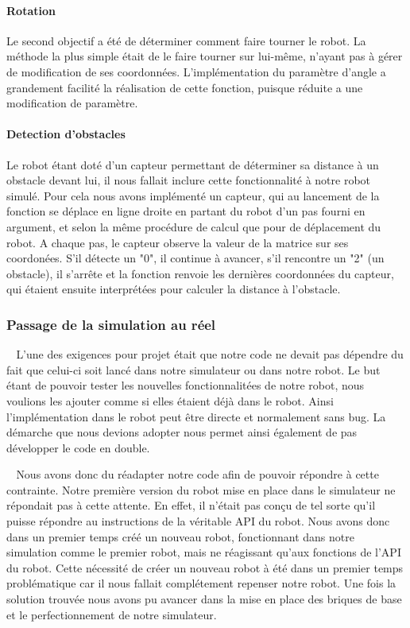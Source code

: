 \documentclass[12pt]{article}
\def\tab{$\>\>\>\>$}
\begin{document}
\paragraph{Rotation\\}
Le second objectif a été de déterminer comment faire tourner le robot. La méthode la plus simple était de le faire tourner sur lui-même, n'ayant pas à gérer de modification de ses coordonnées. L'implémentation du paramètre d'angle a grandement facilité la réalisation de cette fonction, puisque réduite a une modification de paramètre.

\paragraph{Detection d'obstacles\\}
Le robot étant doté d'un capteur permettant de déterminer sa distance à un obstacle devant lui, il nous fallait inclure cette fonctionnalité à notre robot simulé. Pour cela nous avons implémenté un capteur, qui au lancement de la fonction se déplace en ligne droite en partant du robot d'un pas fourni en argument, et selon la même procédure de calcul que pour de déplacement du robot. A chaque pas, le capteur observe la valeur de la matrice sur ses coordonées. S'il détecte un "0", il continue à avancer, s'il rencontre un "2" (un obstacle), il s'arrête et la fonction renvoie les dernières coordonnées du capteur, qui étaient ensuite interprétées pour calculer la distance à l'obstacle.

\subsubsection{Passage de la simulation au réel}
\tab L'une des exigences pour projet était que notre code ne devait pas dépendre du fait que celui-ci soit lancé dans notre simulateur ou dans notre robot. Le but étant de pouvoir tester les nouvelles fonctionnalitées de notre robot, nous voulions les ajouter comme si elles étaient déjà dans le robot. Ainsi l'implémentation dans le robot peut être directe et normalement sans bug. La démarche que nous devions adopter nous permet ainsi également de pas développer le code en double.

\tab Nous avons donc du réadapter notre code afin de pouvoir répondre à cette contrainte. Notre première version du robot mise en place dans le simulateur ne répondait pas à cette attente. En effet, il n'était pas conçu de tel sorte qu'il puisse répondre au instructions de la véritable API du robot. Nous avons donc dans un premier temps créé un nouveau robot, fonctionnant dans notre simulation comme le premier robot, mais ne réagissant qu'aux fonctions de l'API du robot. Cette nécessité de créer un nouveau robot à été dans un premier temps problématique car il nous fallait complétement repenser notre robot. Une fois la solution trouvée nous avons pu avancer dans la mise en place des briques de base et le perfectionnement de notre simulateur.
\end{document}
